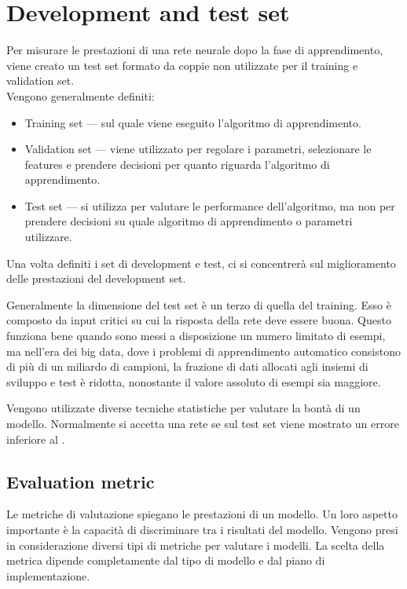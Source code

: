 \section{Development and test set }
\label{sec:DevelopmentAndTestSet}
Per misurare le prestazioni di una rete neurale dopo la fase di apprendimento, viene creato un test set formato da coppie non utilizzate per il training e validation set.\\
Vengono generalmente definiti: 
\begin{itemize}
	\item Training set --- sul quale viene eseguito l'algoritmo di apprendimento.
	\item Validation set --- viene utilizzato per regolare i parametri, selezionare le features e prendere decisioni per quanto riguarda l'algoritmo di apprendimento.
	\item Test set --- si utilizza per valutare le performance dell'algoritmo, ma non per prendere decisioni su quale algoritmo di apprendimento o parametri utilizzare. 
\end{itemize}

Una volta definiti i set di development e test, ci si concentrerà sul miglioramento delle prestazioni del development set. 

Generalmente la dimensione del test set è un terzo di quella del training. Esso è composto da input critici su cui la risposta della rete deve essere buona. 
Questo funziona bene quando sono messi a disposizione un numero limitato di esempi, ma nell'era dei big data, dove i problemi di apprendimento automatico consistono di più di un miliardo di campioni, la frazione di dati allocati agli insiemi di sviluppo e test è ridotta, nonostante il valore assoluto di esempi sia maggiore.

Vengono utilizzate diverse tecniche statistiche per valutare la bontà di un modello. Normalmente si accetta una rete se sul test set viene mostrato un errore inferiore al .


\subsection{Evaluation metric}
\label{subsec:EvaluationMetric}

Le metriche di valutazione spiegano le prestazioni di un modello. Un loro aspetto importante è la capacità di discriminare tra i risultati del modello.
Vengono presi in considerazione diversi tipi di metriche per valutare i modelli. La scelta della metrica dipende completamente dal tipo di modello e dal piano di implementazione. 
\\

